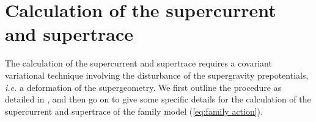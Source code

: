 \chapter{Calculation of the supercurrent and supertrace}
\label{app:supercurrent_supertrace}


The calculation of the supercurrent and supertrace requires a covariant variational technique involving the disturbance of the supergravity prepotentials, {\it i.e.} a deformation of the supergeometry. We first outline the procedure as detailed in \cite{Buchbinder:1998qv}, and then go on to give some specific details for the calculation of the supercurrent and supertrace of the family model (\ref{eq:family action}).

\vskip0.5cm
